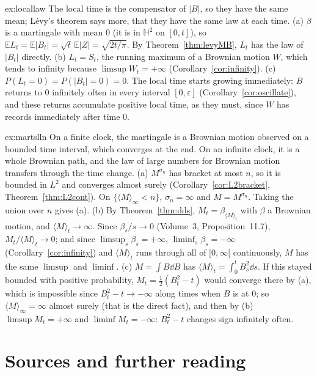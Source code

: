 \begin{solution}{ex:locallaw}
\idea The local time is the compensator of $|B|$, so they have the same mean; L\'evy's theorem says more, that they have the same law at each time.
\writeup (a) $\beta$ is a martingale with mean $0$ (it is in $\mathbb H^2$ on $[0,t]$), so $\mathbb EL_t=\mathbb E|B_t|=\sqrt t\,\mathbb E|Z|=\sqrt{2t/\pi}$. By Theorem~\ref{thm:levyMB}, $L_t$ has the law of $|B_t|$ directly. (b) $L_t=S_t$, the
running maximum of a Brownian motion $W$, which tends to infinity because $\limsup W_t=+\infty$ (Corollary~\ref{cor:infinity}). (c) $P(L_t=0)=P(|B_t|=0)=0$. The local time starts growing immediately: $B$ returns to $0$
infinitely often in every interval $[0,\varepsilon]$ (Corollary~\ref{cor:oscillate}), and these returns accumulate positive local time, as they must, since $W$ has records immediately after time $0$.
\end{solution}

\begin{solution}{ex:martslln}
\idea On a finite clock, the martingale is a Brownian motion observed on a bounded time interval, which converges at the end. On an infinite clock, it is a whole Brownian path, and the law of large numbers for
Brownian motion transfers through the time change.
\writeup (a) $M^{\sigma_n}$ has bracket at most $n$, so it is bounded in $L^2$ and converges almost surely (Corollary~\ref{cor:L2bracket}, Theorem~\ref{thm:L2cont}). On $\{\langle M\rangle_\infty<n\}$, $\sigma_n=\infty$ and $M=M^{\sigma_n}$.
Taking the union over $n$ gives (a). (b) By Theorem~\ref{thm:dds}, $M_t=\beta_{\langle M\rangle_t}$ with $\beta$ a Brownian motion, and $\langle M\rangle_t\to\infty$. Since $\beta_s/s\to0$ (Volume~3, Proposition~11.7), $M_t/\langle M\rangle_t\to0$; and
since $\limsup_s\beta_s=+\infty$, $\liminf_s\beta_s=-\infty$ (Corollary~\ref{cor:infinity}) and $\langle M\rangle_t$ runs through all of $[0,\infty[$ continuously, $M$ has the same $\limsup$ and $\liminf$. (c) $M=\int B\dd B$ has
$\langle M\rangle_t=\int_0^tB_s^2\dd s$. If this stayed bounded with positive probability, $M_t=\frac12(B_t^2-t)$ would converge there by (a), which is impossible since $B_t^2-t\to-\infty$ along times when $B$ is at $0$; so
$\langle M\rangle_\infty=\infty$ almost surely (that is the direct fact), and then by (b) $\limsup M_t=+\infty$ and $\liminf M_t=-\infty$: $B_t^2-t$ changes sign infinitely often.
\end{solution}

\section*{Sources and further reading}

